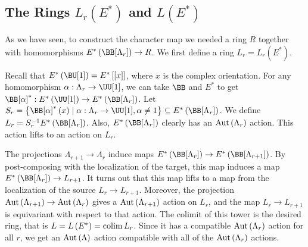 \subsection{The Rings \texorpdfstring{$L_r\left(E^*\right)$}{Lr(E*)} and \texorpdfstring{$L\left(E^*\right)$}{L(E*)}}

As we have seen, to construct the character map we needed a ring $R$ together with homomorphisms $E^*\left(\BB[\Lambda_r]\right) \to R$.
We first define a ring $L_r = L_r\left(E^*\right)$.

Recall that $E^*\left(\BU[1]\right) = E^*\left[\left[x\right]\right]$, where $x$ is the complex orientation.
For any homomorphism $\alpha: \Lambda_r \to \UU[1]$, we can take $\BB$ and $E^*$ to get $\BB[\alpha]^*: E^*\left(\UU[1]\right) \to E^*\left(\BB[\Lambda_r]\right)$.
Let $S_r = \left\{ \BB[\alpha]^*\left(x\right) \mid \alpha: \Lambda_r \to \UU[1], \alpha \neq 1 \right\} \subseteq E^*\left(\BB[\Lambda_r]\right)$.
We define $L_r = S_r^{-1} E^*\left(\BB[\Lambda_r]\right)$.
Also, $E^*\left(\BB[\Lambda_r]\right)$ clearly has an $\operatorname{Aut}\left(\Lambda_r\right)$ action. 
This action lifts to an action on $L_r$. 

The projections $\Lambda_{r+1} \to \Lambda_r$ induce maps $E^*\left(\BB[\Lambda_r]\right) \to E^*\left(\BB[\Lambda_{r+1}]\right)$.
By post-composing with the localization of the target, this map induces a map $E^*\left(\BB[\Lambda_r]\right) \to L_{r+1}$.
It turns out that this map lifts to a map from the localization of the source $L_r \to L_{r+1}$. 
Moreover, the projection $\operatorname{Aut}\left(\Lambda_{r+1}\right) \to \operatorname{Aut}\left(\Lambda_r\right)$ gives a $\operatorname{Aut}\left(\Lambda_{r+1}\right)$ action on $L_r$, and the map $L_r \to L_{r+1}$ is equivariant with respect to that action. 
The colimit of this tower is the desired ring, that is $L = L\left(E^*\right) = \operatorname{colim} L_r$.
Since it has a compatible $\operatorname{Aut}\left(\Lambda_r\right)$ action for all $r$, we get an $\operatorname{Aut}\left(\Lambda\right)$ action compatible with all of the $\operatorname{Aut}\left(\Lambda_r\right)$ actions.

